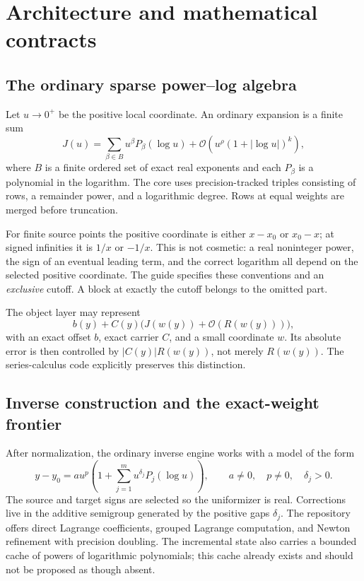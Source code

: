 \documentclass[11pt,letterpaper]{article}
\newcommand{\OO}{\mathcal{O}}
\begin{document}
\section{Architecture and mathematical contracts}
\subsection{The ordinary sparse power--log algebra}
Let $u\to0^+$ be the positive local coordinate. An ordinary expansion is a finite sum
\begin{equation}\label{eq:jet}
 J(u)=\sum_{\beta\in B}u^\beta P_\beta(\log u)
       +\OO\!\left(u^\rho(1+|\log u|)^k\right),
\end{equation}
where $B$ is a finite ordered set of exact real exponents and each $P_\beta$ is a polynomial in the logarithm. The core uses precision-tracked triples consisting of rows, a remainder power, and a logarithmic degree. Rows at equal weights are merged before truncation.\cite{core,operations}

For finite source points the positive coordinate is either $x-x_0$ or $x_0-x$; at signed infinities it is $1/x$ or $-1/x$. This is not cosmetic: a real noninteger power, the sign of an eventual leading term, and the correct logarithm all depend on the selected positive coordinate. The guide specifies these conventions and an \emph{exclusive} cutoff. A block at exactly the cutoff belongs to the omitted part.\cite{guide,core}

The object layer may represent
\begin{equation}\label{eq:carrier}
 b(y)+C(y)\bigl(J(w(y))+\OO(R(w(y)))\bigr),
\end{equation}
with an exact offset $b$, exact carrier $C$, and a small coordinate $w$. Its absolute error is then controlled by $|C(y)|R(w(y))$, not merely $R(w(y))$. The series-calculus code explicitly preserves this distinction.\cite{operations}

\subsection{Inverse construction and the exact-weight frontier}
After normalization, the ordinary inverse engine works with a model of the form
\begin{equation}\label{eq:model}
 y-y_0=a u^p\left(1+\sum_{j=1}^m u^{\delta_j}P_j(\log u)\right),
 \qquad a\ne0,\quad p\ne0,\quad\delta_j>0.
\end{equation}
The source and target signs are selected so the uniformizer is real. Corrections live in the additive semigroup generated by the positive gaps $\delta_j$. The repository offers direct Lagrange coefficients, grouped Lagrange computation, and Newton refinement with precision doubling. The incremental state also carries a bounded cache of powers of logarithmic polynomials; this cache already exists and should not be proposed as though absent.\cite{core,incremental,guide}
\end{document}
